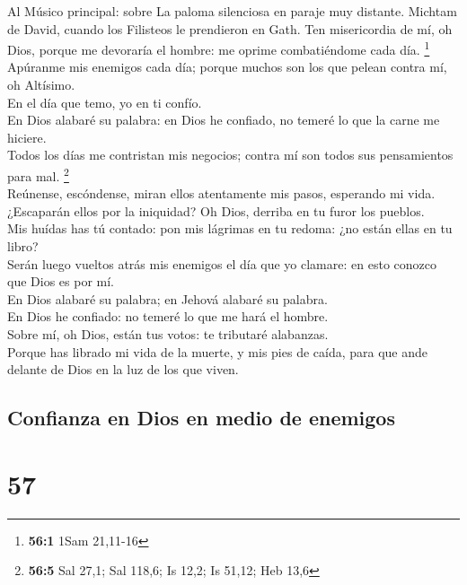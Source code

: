  Al Músico principal: sobre La paloma silenciosa en paraje
muy distante. Michtam de David, cuando los Filisteos le prendieron en
Gath. Ten misericordia de mí, oh Dios, porque me devoraría el hombre: me
oprime combatiéndome cada día. \footnote{\textbf{56:1} 1Sam 21,11-16}\\
 Apúranme mis enemigos cada día; porque muchos son los que
pelean contra mí, oh Altísimo.\\
 En el día que temo, yo en ti confío.\\
 En Dios alabaré su palabra: en Dios he confiado, no
temeré lo que la carne me hiciere.\\
 Todos los días me contristan mis negocios; contra mí son
todos sus pensamientos para mal. \footnote{\textbf{56:5} Sal 27,1; Sal
  118,6; Is 12,2; Is 51,12; Heb 13,6}\\
 Reúnense, escóndense, miran ellos atentamente mis pasos,
esperando mi vida.\\
 ¿Escaparán ellos por la iniquidad? Oh Dios, derriba en tu
furor los pueblos.\\
 Mis huídas has tú contado: pon mis lágrimas en tu redoma:
¿no están ellas en tu libro?\\
 Serán luego vueltos atrás mis enemigos el día que yo
clamare: en esto conozco que Dios es por mí.\\
 En Dios alabaré su palabra; en Jehová alabaré su
palabra.\\
 En Dios he confiado: no temeré lo que me hará el
hombre.\\
 Sobre mí, oh Dios, están tus votos: te tributaré
alabanzas.\\
 Porque has librado mi vida de la muerte, y mis pies de
caída, para que ande delante de Dios en la luz de los que viven.

\hypertarget{confianza-en-dios-en-medio-de-enemigos}{%
\subsection{Confianza en Dios en medio de
enemigos}\label{confianza-en-dios-en-medio-de-enemigos}}

\hypertarget{section-56}{%
\section{57}\label{section-56}}

